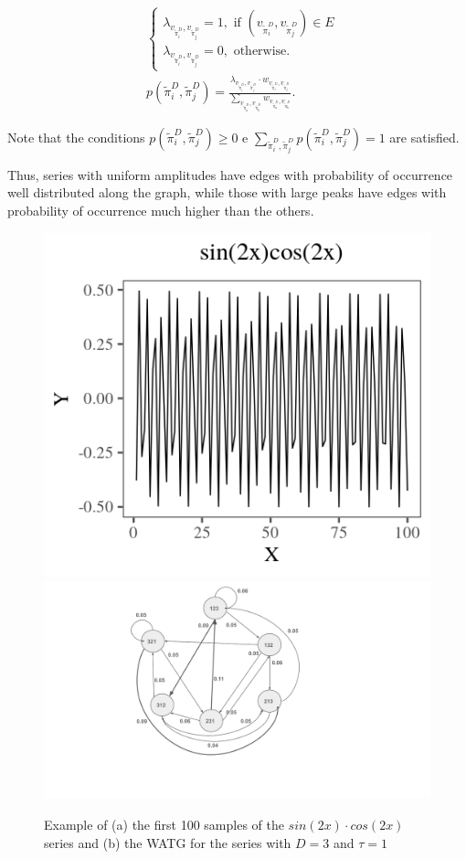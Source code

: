 \documentclass[paper=letter, fontsize=12pt]{article}
\begin{document}
\begin{align}
&\left\{\begin{array}{l}
\lambda_{v_{\widetilde\pi^D_i}, v_{\widetilde\pi^D_j}} = 1, \text{ if } (v_{\widetilde\pi^D_i}, v_{\widetilde\pi^D_j}) \in {E} \\
\lambda_{v_{\widetilde\pi^D_i}, v_{\widetilde\pi^D_j}} = 0, \text{ otherwise}.
\end{array}\right. \\
%
&p(\widetilde\pi^D_i, \widetilde\pi^D_j) = \frac{\lambda_{v_{\widetilde\pi^D_i}, v_{\widetilde\pi^D_j}} \cdot w_{v_{\widetilde\pi^D_i}, v_{\widetilde\pi^D_j}}}{\sum_{v_{\widetilde\pi^D_a}, v_{\widetilde\pi^D_b}} w_{v_{\widetilde\pi^D_a}, v_{\widetilde\pi^D_b}}}.
\end{align}

Note that the conditions $p(\widetilde\pi^D_i, \widetilde\pi^D_j) \ge 0$ e $\sum_{\widetilde\pi^D_i, \widetilde\pi^D_j} p(\widetilde\pi^D_i, \widetilde\pi^D_j) = 1$ are satisfied.

Thus, series with uniform amplitudes have edges with probability of occurrence well distributed along the graph, while those with large peaks have edges with probability of occurrence much higher than the others.

\begin{figure}[hbt]
	\centering
	\includegraphics[width=.45\linewidth]{Figures/plotsincos.png}
	\includegraphics[width=.4\linewidth]{Figures/graph.pdf}
	\caption{Example of (a) the first 100 samples of the $sin (2x) \cdot cos (2x)$ series and (b) the WATG for the series with $D = 3$ and $\tau = 1$}\label{fig:series}
\end{figure} 
\end{document}
